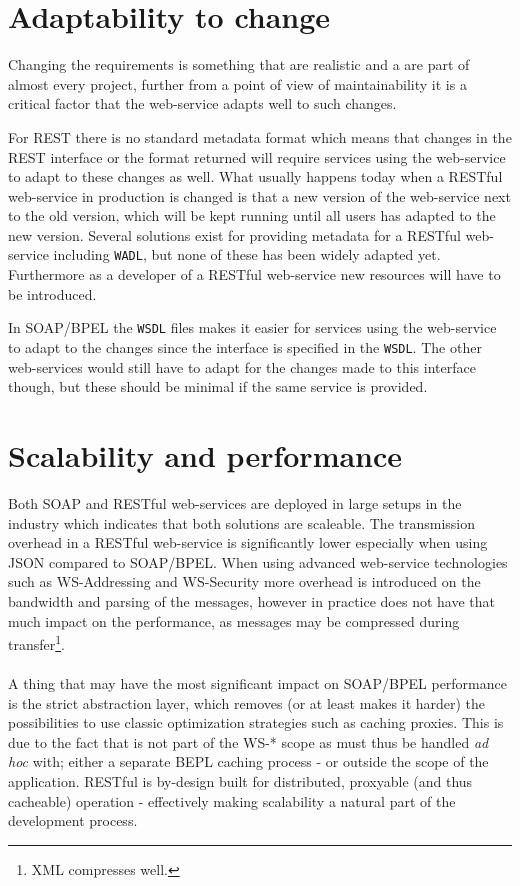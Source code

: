 \section{Adaptability to change}
Changing the requirements is something that are realistic and a are part of almost every project, further from a point of view of maintainability it is a critical factor that the web-service adapts well to such changes.

For REST there is no standard metadata format which means that changes in the REST interface or the format returned will require services using the web-service to adapt to these changes as well. What usually happens today when a RESTful web-service in production is changed is that a new version of the web-service next to the old version, which will be kept running until all users has adapted to the new version. Several solutions exist for providing metadata for a RESTful web-service including \texttt{WADL}, but none of these has been widely adapted yet. Furthermore as a developer of a RESTful web-service new resources will have to be introduced.

In SOAP/BPEL the \texttt{WSDL} files makes it easier for services using the web-service to adapt to the changes since the interface is specified in the \texttt{WSDL}. The other web-services would still have to adapt for the changes made to this interface though, but these should be minimal if the same service is provided.

\section{Scalability and performance}
Both SOAP and RESTful web-services are deployed in large setups in the industry which indicates that both solutions are scaleable. The transmission overhead in a RESTful web-service is significantly lower especially when using JSON compared to SOAP/BPEL. When using advanced web-service technologies such as WS-Addressing and WS-Security more overhead is introduced on the bandwidth and parsing of the messages, however in practice does not have that much impact on the performance, as messages may be compressed during transfer\footnote{XML compresses well.}.\\\\
A thing that may have the most significant impact on SOAP/BPEL performance is the strict abstraction layer, which removes (or at least makes it harder) the possibilities to use classic optimization strategies such as caching proxies. This is due to the fact that is not part of the WS-* scope as must thus be handled \emph{ad hoc} with; either a separate BEPL caching process - or outside the scope of the application. RESTful is by-design built for distributed, proxyable (and thus cacheable) operation - effectively making scalability a natural part of the development process.

